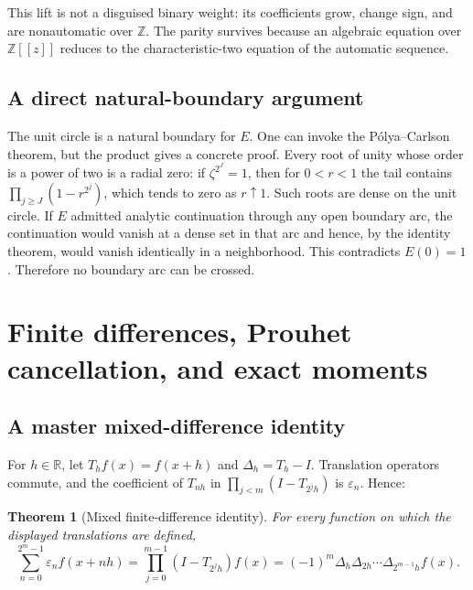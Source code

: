\documentclass[11pt,oneside]{article}
\newtheorem{theorem}{Theorem}[section]
\theoremstyle{definition}
\theoremstyle{remark}
\newcommand{\R}{\mathbb R}
\newcommand{\Z}{\mathbb Z}
\newcommand{\eps}{\varepsilon}
\begin{document}
This lift is not a disguised binary weight: its coefficients grow, change sign, and are
nonautomatic over \(\Z\).  The parity survives because an algebraic equation over
\(\Z[[z]]\) reduces to the characteristic-two equation of the automatic sequence.

\subsection{A direct natural-boundary argument}

The unit circle is a natural boundary for \(E\).  One can invoke the P\'olya--Carlson theorem,
but the product gives a concrete proof.  Every root of unity whose order is a power of two
is a radial zero: if \(\zeta^{2^J}=1\), then for \(0<r<1\) the tail contains
\(\prod_{j\ge J}(1-r^{2^j})\), which tends to zero as \(r\uparrow1\).  Such roots are dense
on the unit circle.  If \(E\) admitted analytic continuation through any open boundary arc,
the continuation would vanish at a dense set in that arc and hence, by the identity theorem,
would vanish identically in a neighborhood.  This contradicts \(E(0)=1\).  Therefore no
boundary arc can be crossed.

\section{Finite differences, Prouhet cancellation, and exact moments}
\label{sec:prouhet}

\subsection{A master mixed-difference identity}

For \(h\in\R\), let \(T_hf(x)=f(x+h)\) and
\(\Delta_h=T_h-I\).  Translation operators commute, and the coefficient of
\(T_{nh}\) in \(\prod_{j<m}(I-T_{2^jh})\) is \(\eps_n\).  Hence:

\begin{theorem}[Mixed finite-difference identity]
\label{thm:mixed-difference}
For every function on which the displayed translations are defined,
\begin{equation}
  \boxed{
  \sum_{n=0}^{2^m-1}\eps_nf(x+nh)
   =\prod_{j=0}^{m-1}(I-T_{2^jh})f(x)
   =(-1)^m\Delta_h\Delta_{2h}\cdots\Delta_{2^{m-1}h}f(x).}  \label{eq:mixed-difference}
\end{equation}
\end{theorem}
\end{document}
